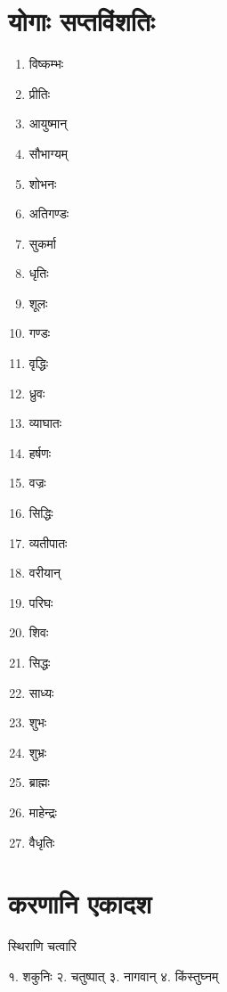 \section*{योगाः सप्तविंशतिः}

\begin{multicols}{3}
\begin{enumerate}\itemsep-1ex 

\item विष्कम्भः 
\item प्रीतिः 
\item आयुष्मान् 
\item सौभाग्यम् 
\item शोभनः 
\item अतिगण्डः 
\item सुकर्मा 
\item धृतिः 
\item शूलः
\item गण्डः 
\item वृद्धिः 
\item ध्रुवः 
\item व्याघातः 
\item हर्षणः 
\item वज्रः 
\item सिद्धिः 
\item व्यतीपातः 
\item वरीयान्
\item परिघः 
\item शिवः 
\item सिद्धः 
\item साध्यः 
\item शुभः 
\item शुभ्रः 
\item ब्राह्मः 
\item माहेन्द्रः 
\item वैधृतिः

\end{enumerate}
\end{multicols}

\section*{करणानि एकादश} 

{स्थिराणि चत्वारि}

१. शकुनिः \hspace{2ex} २. चतुष्पात् \hspace{2ex} ३. नागवान् \hspace{2ex} ४. किंस्तुघ्नम्


